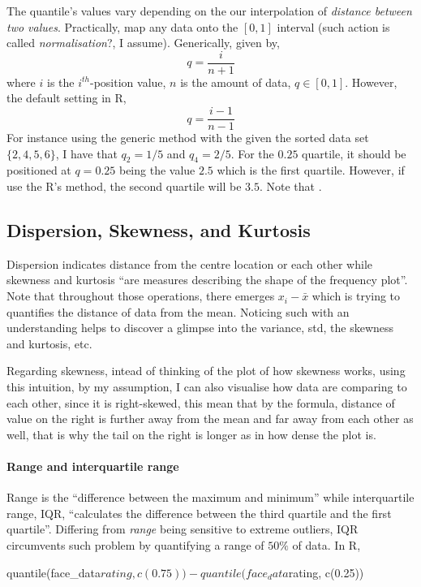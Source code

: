     The quantile's values vary depending on the our interpolation of \emph{distance between two values}. Practically, map any data onto the $[0,1]$ interval (such action is called \emph{normalisation}?, I assume).
    Generically, given by,
    \begin{equation}
        q=\frac{i}{n+1}
    \end{equation}
    where $i$ is the $i^{th}$-position value, $n$ is the amount of data, $q\in[0,1]$.
    However, the default setting in R,
    \begin{equation}
        q=\frac{i-1}{n-1}
    \end{equation}
    For instance using the generic method with the given the sorted data set $\{2,4,5,6\}$, I have that $q_2=1/5$ and $q_4=2/5$. For the $0.25$ quartile, it should be positioned at $q=0.25$ being the value $2.5$ which is 
    the first quartile. However, if use the R's method, the second quartile will be $3.5$. Note that .
\subsection{Dispersion, Skewness, and Kurtosis}
    Dispersion indicates distance from the centre location or each other while skewness and kurtosis ``are measures describing the shape of the frequency plot''. Note that throughout those operations, there emerges 
    $x_i-\bar{x}$ which is trying to quantifies the distance of data from the mean. Noticing such with an understanding helps to discover a glimpse into the variance, std, the skewness and kurtosis, etc. 
    
    Regarding skewness, intead of thinking of the plot of how skewness works, using this intuition, by my assumption, I can also visualise how data are comparing to each other, since it is right-skewed, this mean that by 
    the formula, distance of value on the right is further away from the mean and far away from each other as well, that is why the tail on the right is longer as in how dense the plot is. 
\paragraph{Range and interquartile range}
    Range is the ``difference between the maximum and minimum'' while interquartile range, IQR, ``calculates the difference between the third quartile and the first quartile''. Differing from \emph{range} being sensitive
    to extreme outliers, IQR circumvents such problem by quantifying a range of $50\%$ of data. In R,
    \begin{Rblock}
        quantile(face_data$rating, c(0.75)) - quantile(face_data$rating, c(0.25))
    \end{Rblock}
